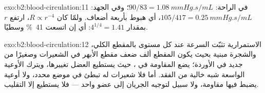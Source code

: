 \begin{solution}{exo:b2:blood-circulation:11}
في الراحة: $90/83 = \qty{1.08}{mmHg.s/mL}$؛ وفي الجهد: $105/417 =
\qty{0.25}{mmHg.s/mL}$، أي هبوط بأربعة أضعاف. ولمّا كان $R \propto r^{-4}$،
ارتفع $r$ بمقدار $4^{1/4} = 1.41$: أي إن  اتسعت
\qty{41}{\%} وسطيًا.
\end{solution}

\begin{solution}{exo:b2:blood-circulation:12}
الاستمرارية تثبّت السرعة عند كل مستوى بالمقطع
الكلي، والشجرة مبنية بحيث يكون المقطع ألف
ضعف مقطع الأبهر في الشعيرات وصغيرًا من جديد في
الأوردة؛  يضع المقاومة في ،
حيث يستطيع العضل تغييرها، ويترك الأوعية الواسعة شبه خالية
من الفقد. أما  فلا شعيرات له تبطئ  في
موضع محدد، ولا أوعية يضبط فيها مقاومة، ولا سبيل
لتوجيه الجريان إلى عضو واحد --- فلا يستطيع إلا التقليب.
\end{solution}

